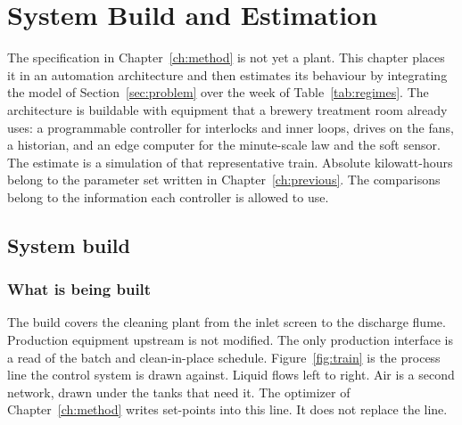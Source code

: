 \chapter{System Build and Estimation}
\label{ch:estimate}

The specification in Chapter~\ref{ch:method} is not yet a plant. This chapter places it in an automation architecture and then estimates its behaviour by integrating the model of Section~\ref{sec:problem} over the week of Table~\ref{tab:regimes}. The architecture is buildable with equipment that a brewery treatment room already uses: a programmable controller for interlocks and inner loops, drives on the fans, a historian, and an edge computer for the minute-scale law and the soft sensor. The estimate is a simulation of that representative train. Absolute kilowatt-hours belong to the parameter set written in Chapter~\ref{ch:previous}. The comparisons belong to the information each controller is allowed to use.

\section{System build}
\label{sec:build}

\subsection{What is being built}

The build covers the cleaning plant from the inlet screen to the discharge flume. Production equipment upstream is not modified. The only production interface is a read of the batch and clean-in-place schedule. Figure~\ref{fig:train} is the process line the control system is drawn against. Liquid flows left to right. Air is a second network, drawn under the tanks that need it. The optimizer of Chapter~\ref{ch:method} writes set-points into this line. It does not replace the line.

